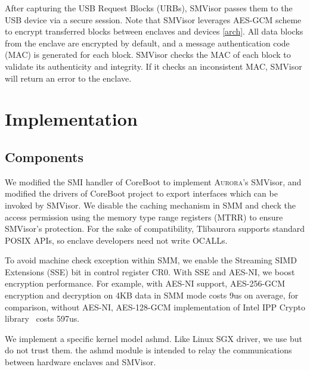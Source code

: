 After capturing the USB Request Blocks (URBs), SMVisor passes them to the USB device via a secure session.  Note that SMVisor leverages AES-GCM scheme to encrypt transferred blocks between enclaves and devices \ref{arch}. All data blocks from the enclave are encrypted by default, and a message authentication code (MAC) is generated for each block. SMVisor checks the MAC of each block to validate its authenticity and integrity. If it checks an inconsistent MAC, SMVisor will return an error to the enclave.

\section{Implementation}

\subsection{Components}

We modified the SMI handler of CoreBoot to implement \textsc{Aurora}'s SMVisor, and modified the drivers of CoreBoot project to export interfaces which can be invoked by SMVisor. We disable the caching mechanism in SMM and check the access permission using the memory type range registers (MTRR) to ensure SMVisor's protection. For the sake of compatibility, Tlibaurora supports standard
POSIX APIs, so enclave developers need not write OCALLs.

To avoid machine check exception within SMM, we enable the Streaming SIMD Extensions (SSE) bit in control register CR0. With SSE and AES-NI, we boost encryption performance. For example, with AES-NI support, AES-256-GCM encryption and decryption on 4KB data in SMM mode costs 9us on average, for comparison,  without AES-NI, AES-128-GCM implementation of Intel IPP Crypto library~\cite{Intel_IPP_2017_Update_2} costs 597us.

We implement a specific kernel model ashmd. Like Linux SGX driver, we use but do not trust them. the ashmd module is intended to relay the communications between hardware enclaves and SMVisor.

